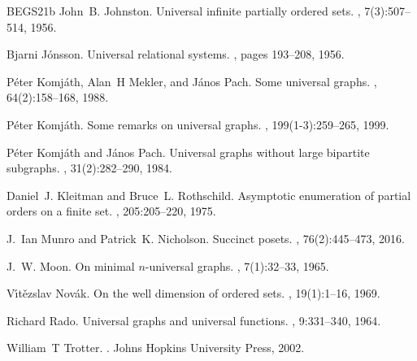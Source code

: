 \documentclass[11pt]{article}
\newcommand{\1}{\mathbbm{1}}
\begin{document}
\begin{thebibliography}{BEGS21b}
John~B. Johnston.
\newblock Universal infinite partially ordered sets.
, 7(3):507--514, 1956.

Bjarni J{\'o}nsson.
\newblock Universal relational systems.
, pages 193--208, 1956.

P{\'e}ter Komj{\'a}th, Alan~H Mekler, and J{\'a}nos Pach.
\newblock Some universal graphs.
, 64(2):158--168, 1988.

P{\'e}ter Komj{\'a}th.
\newblock Some remarks on universal graphs.
, 199(1-3):259--265, 1999.

P{\'e}ter Komj{\'a}th and J{\'a}nos Pach.
\newblock Universal graphs without large bipartite subgraphs.
, 31(2):282--290, 1984.

Daniel~J. Kleitman and Bruce~L. Rothschild.
\newblock Asymptotic enumeration of partial orders on a finite set.
, 205:205–220, 1975.

J.~Ian Munro and Patrick~K. Nicholson.
\newblock Succinct posets.
, 76(2):445--473, 2016.

J.~W. Moon.
\newblock On minimal $n$-universal graphs.
, 7(1):32--33, 1965.

V{\'\i}t{\v{e}}zslav Nov{\'a}k.
\newblock On the well dimension of ordered sets.
, 19(1):1--16, 1969.

Richard Rado.
\newblock Universal graphs and universal functions.
, 9:331--340, 1964.

William~T Trotter.
.
\newblock Johns Hopkins University Press, 2002.

\end{thebibliography}
\end{document}
